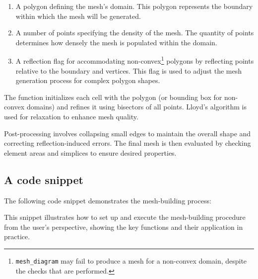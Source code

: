 \begin{enumerate}
    \item A polygon defining the mesh's domain. This polygon represents the boundary within which the mesh will be generated.
    \item A number of points specifying the density of the mesh. The quantity of points determines how densely the mesh is populated within the domain.
    \item A reflection flag for accommodating non-convex\footnote{\lstinline{mesh_diagram} may fail to produce a mesh for a non-convex domain, despite the checks that are performed.} polygons by reflecting points relative to the boundary and vertices. This flag is used to adjust the mesh generation process for complex polygon shapes.
\end{enumerate}

The function initializes each cell with the polygon (or bounding box for non-convex domains) and refines it using bisectors of all points. Lloyd's algorithm is used for relaxation to enhance mesh quality.

Post-processing involves collapsing small edges to maintain the overall shape and correcting reflection-induced errors. The final mesh is then evaluated by checking element areas and simplices to ensure desired properties.

\newpage
\subsection{A code snippet}

The following code snippet demonstrates the mesh-building process:



This snippet illustrates how to set up and execute the mesh-building procedure from the user's perspective, showing the key functions and their application in practice.
